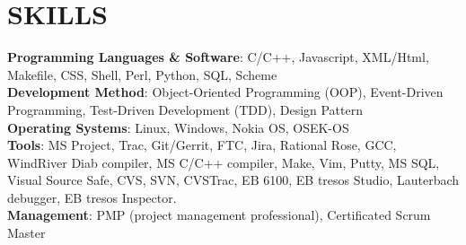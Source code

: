 
\section{SKILLS} \textbf{Programming Languages \& Software}:
C/C++, Javascript, XML/Html, Makefile, CSS, Shell, Perl, Python, SQL, Scheme\\
                \textbf{Development Method}:
                Object-Oriented Programming (OOP),
                Event-Driven Programming,
                Test-Driven Development (TDD),
                Design Pattern\\
                \textbf{Operating Systems}: Linux, Windows, Nokia OS, OSEK-OS\\
                \textbf{Tools}:
                MS Project, Trac, Git/Gerrit, FTC, Jira, Rational Rose,
                GCC, WindRiver Diab compiler, MS C/C++ compiler, Make,
                Vim, Putty, MS SQL, Visual Source Safe, CVS, SVN, CVSTrac,
                EB 6100, EB tresos Studio, Lauterbach debugger, EB tresos Inspector. \\
                \textbf{Management}: PMP (project management professional), Certificated Scrum Master

